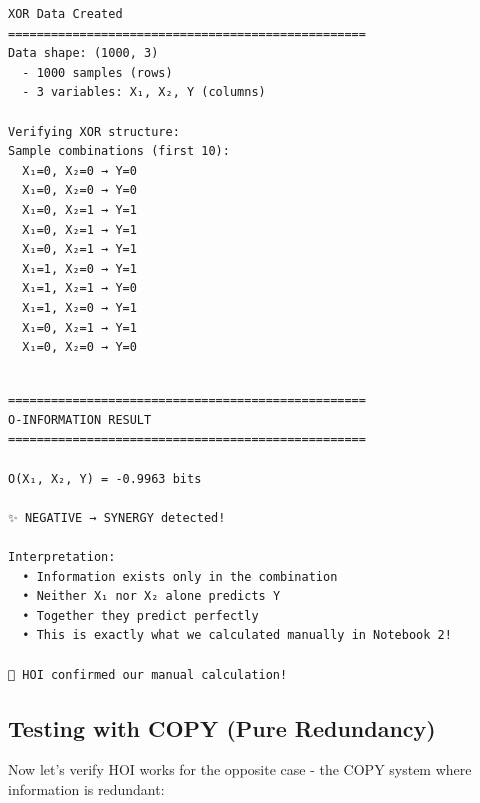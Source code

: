 \documentclass[
  11pt,
  letterpaper,
  oneside,
  openany]{book}
\begin{document}
\begin{verbatim}
XOR Data Created
==================================================
Data shape: (1000, 3)
  - 1000 samples (rows)
  - 3 variables: X₁, X₂, Y (columns)

Verifying XOR structure:
Sample combinations (first 10):
  X₁=0, X₂=0 → Y=0
  X₁=0, X₂=0 → Y=0
  X₁=0, X₂=1 → Y=1
  X₁=0, X₂=1 → Y=1
  X₁=0, X₂=1 → Y=1
  X₁=1, X₂=0 → Y=1
  X₁=1, X₂=1 → Y=0
  X₁=1, X₂=0 → Y=1
  X₁=0, X₂=1 → Y=1
  X₁=0, X₂=0 → Y=0
\end{verbatim}

\begin{verbatim}

==================================================
O-INFORMATION RESULT
==================================================

O(X₁, X₂, Y) = -0.9963 bits

✨ NEGATIVE → SYNERGY detected!

Interpretation:
  • Information exists only in the combination
  • Neither X₁ nor X₂ alone predicts Y
  • Together they predict perfectly
  • This is exactly what we calculated manually in Notebook 2!

🎯 HOI confirmed our manual calculation!
\end{verbatim}

\subsection{Testing with COPY (Pure
Redundancy)}\label{testing-with-copy-pure-redundancy}

Now let's verify HOI works for the opposite case - the COPY system where
information is redundant:
\end{document}
